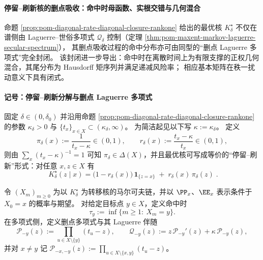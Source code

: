 
\paragraph{停留--刷新核的删点吸收：命中时母函数、实根交错与几何混合}
命题 \ref{prop:pom-diagonal-rate-diagonal-closure-rankone} 给出的最优核
\(
K^\star_\delta
\)
不仅在谱侧由 Laguerre--世俗多项式 \(\mathcal Q_\delta\) 控制（定理 \ref{thm:pom-maxent-markov-laguerre-secular-spectrum}），
其删点吸收过程的命中分布亦可由同型的“删点 Laguerre 多项式”完全封闭。
该封闭进一步导出：命中时在离散时间上为有限支撑的正权几何混合，其尾分布为 Hausdorff 矩序列并满足递减风险率；
相应基本矩阵在秩一扰动意义下具有闭式。

\paragraph{记号：停留--刷新分解与删点 Laguerre 多项式}
固定 \(\delta\in(0,\delta_0)\) 并沿用命题 \ref{prop:pom-diagonal-rate-diagonal-closure-rankone} 的参数 \(\kappa_\delta>0\) 与 \(\{t_x\}_{x\in X}\subset(\kappa_\delta,\infty)\)。
为简洁起见以下写 \(\kappa:=\kappa_\delta\)。
定义
\[
\pi_\delta(x):=\frac{1}{t_x-\kappa}\in(0,1),
\qquad
r_\delta(x):=\frac{t_x-\kappa}{t_x}\in(0,1),
\]
则由 \(\sum_x (t_x-\kappa)^{-1}=1\) 可知 \(\pi_\delta\in\Delta(X)\)，并且最优核可写成等价的“停留--刷新”形式：对任意 \(x,z\in X\) 有
\begin{equation}\label{eq:pom-diagonal-rate-hitting-stay-refresh}
\boxed{\;
K^\star_\delta(z\mid x)
=\bigl(1-r_\delta(x)\bigr)\,\mathbf 1_{\{z=x\}}
\;+\;
r_\delta(x)\,\pi_\delta(z)\; } .
\end{equation}

\begin{definition}\label{def:pom-diagonal-rate-absorbing-laguerre-hit}
令 \((X_m)_{m\ge 0}\) 为以 \(K^\star_\delta\) 为转移核的马尔可夫链，并以 \(\PP_x\)、\(\EE_x\) 表示条件于 \(X_0=x\) 的概率与期望。
对给定目标点 \(y\in X\)，定义命中时
\[
\tau_y:=\inf\{m\ge 1:\ X_m=y\}.
\]
在多项式侧，定义删点多项式与其 Laguerre 伴随
\[
\mathcal P_{-y}(z):=\prod_{u\in X\setminus\{y\}}(t_u-z),
\qquad
\mathcal Q_{-y}(z):=z\,\mathcal P_{-y}'(z)+\kappa\,\mathcal P_{-y}(z),
\]
并对 \(x\ne y\) 记
\(
\mathcal P_{-x,-y}(z):=\prod_{u\in X\setminus\{x,y\}}(t_u-z)
\)。
\end{definition}



